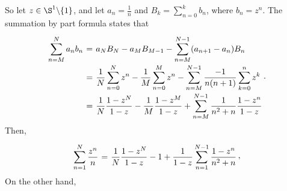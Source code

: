 So let $z\in \S^1\backslash \{1\}$, and let $a_n = \frac{1}{n}$ and $B_k = \sum_{n = 0}^{k}b_n$, where $b_n = z^n$. The summation by part formula states that
\[ \everymath{\displaystyle}
\arraycolsep=1.8pt\def\arraystretch{2.5}
\begin{array}{rcl}
    \sum_{n = M}^N a_n b_n & = & a_N B_N - a_M B_{M-1} - \sum_{n = M}^{N-1}(a_{n+1}- a_n)B_n\\
    & = & \frac{1}{N} \sum_{n = 0}^{N} z^n - \frac{1}{M}\sum_{n = 0}^{M} z^n - \sum_{n = M}^{N-1}\frac{-1}{n(n+1)}\sum_{k = 0}^{n} z^k\\
    & = & \frac{1}{N} \frac{1-z^N}{1-z} - \frac{1}{M} \frac{1-z^M}{1-z} + \sum_{n = M}^{N-1} \frac{1}{n^2 + n} \frac{1-z^n}{1-z}
\end{array}. \]
Then,
\[ \everymath{\displaystyle}
\arraycolsep=1.8pt\def\arraystretch{2.5}
\begin{array}{rcl}
    \sum_{n = 1}^N \frac{z^n}{n} & = & \frac{1}{N} \frac{1-z^N}{1-z} - 1 + \frac{1}{1-z}\sum_{n = 1}^{N-1} \frac{1-z^n}{n^2 + n} 
\end{array}, \]
On the other hand,

